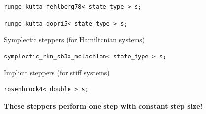 \begin{frame}[fragile]


  \vspace{2ex}

  \begin{lstlisting}
runge_kutta_fehlberg78< state_type > s;
  \end{lstlisting}

  \begin{lstlisting}
runge_kutta_dopri5< state_type > s;
  \end{lstlisting}

  \vspace{2ex}
  Symplectic steppers (for Hamiltonian systems)
  \begin{lstlisting}
symplectic_rkn_sb3a_mclachlan< state_type > s;
  \end{lstlisting}

  \vspace{2ex}
  Implicit steppers (for stiff systems)
  \begin{lstlisting}
rosenbrock4< double > s;
  \end{lstlisting}

  \vspace{2ex}
  {\bf These steppers perform one step with constant step size!}

\end{frame}

